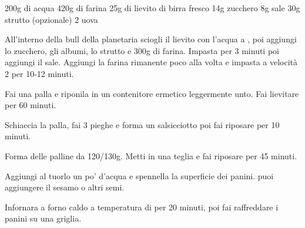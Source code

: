 \begin{ingreds}
	200g di acqua
	420g di farina
	25g di lievito di birra fresco
	14g zucchero
	8g sale
	30g strutto (opzionale)
	2 uova
\end{ingreds}

\begin{method}
	All'interno della bull della planetaria sciogli il lievito con l'acqua a , poi aggiungi lo zucchero, gli albumi, lo strutto e 300g di farina. Impasta per 3 minuti poi aggiungi il sale. Aggiungi la farina rimanente poco alla volta e impasta a velocità 2 per 10-12 minuti.

	Fai una palla e riponila in un contenitore ermetico leggermente unto. Fai lievitare per 60 minuti.

	Schiaccia la palla, fai 3 pieghe e forma un salsicciotto poi fai riposare per 10 minuti.

	Forma delle palline da 120/130g. Metti in una teglia e fai riposare per 45 minuti.

	Aggiungi al tuorlo un po' d'acqua e spennella la superficie dei panini. puoi aggiungere il sesamo o altri semi.

	Infornara a forno caldo a temperatura di  per 20 minuti, poi fai raffreddare i panini su una griglia. 
\end {method}

